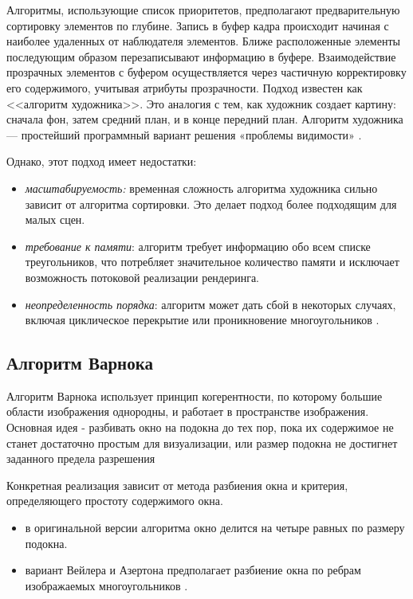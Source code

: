 Алгоритмы, использующие список приоритетов, предполагают предварительную сортировку элементов по глубине. Запись в буфер кадра происходит начиная с наиболее удаленных от наблюдателя элементов. Ближе расположенные элементы последующим образом перезаписывают информацию в буфере. Взаимодействие прозрачных элементов с буфером осуществляется через частичную корректировку его содержимого, учитывая атрибуты прозрачности. Подход известен как <<алгоритм художника>>. Это аналогия с тем, как художник создает картину: сначала фон, затем средний план, и в конце передний план. Алгоритм художника --- простейший программный вариант решения «проблемы видимости» \cite{light, del_line}. 

Однако, этот подход имеет недостатки:
\begin{itemize}
\item \textit{масштабируемость:} временная сложность алгоритма художника сильно зависит от алгоритма сортировки. Это делает подход более подходящим для малых сцен.
\item \textit{требование к памяти}: алгоритм требует информацию обо всем списке треугольников, что потребляет значительное количество памяти и исключает возможность потоковой реализации рендеринга.
\item \textit{неопределенность порядка}: алгоритм может дать сбой в некоторых случаях, включая циклическое перекрытие или проникновение многоугольников \cite{light}.
\end{itemize}

\subsection{Алгоритм Варнока}

Алгоритм Варнока использует принцип когерентности, по которому большие области изображения однородны, и работает в пространстве изображения. Основная идея - разбивать окно на подокна до тех пор, пока их содержимое не станет достаточно простым для визуализации, или размер подокна не достигнет заданного предела разрешения \cite{del_line, varnok}

Конкретная реализация зависит от метода разбиения окна и 
критерия, определяющего простоту содержимого окна.
\begin{itemize}
\item в оригинальной версии алгоритма окно делится на четыре равных по размеру подокна.
\item вариант Вейлера и Азертона предполагает разбиение окна по ребрам изображаемых многоугольников \cite{varnok}.
\end{itemize}

